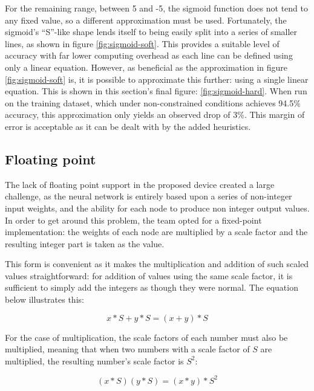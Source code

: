 For the remaining range, between 5 and -5, the sigmoid function does not tend to any fixed value, so a different approximation must be used. Fortunately, the sigmoid's ``S''-like shape lends itself to being easily split into a series of smaller lines, as shown in figure \ref{fig:sigmoid-soft}. This provides a suitable level of accuracy with far lower computing overhead as each line can be defined using only a linear equation. However, as beneficial as the approximation in figure \ref{fig:sigmoid-soft} is, it is possible to approximate this further: using a single linear equation. This is shown in this section's final figure: \ref{fig:sigmoid-hard}. When run on the training dataset, which under non-constrained conditions achieves 94.5\% accuracy, this approximation only yields an observed drop of 3\%. This margin of error is acceptable as it can be dealt with by the added heuristics.

\subsection{Floating point \label{sec:floating-point}}
The lack of  floating point support in the proposed device created a large challenge, as the neural network is entirely based upon a series of non-integer input weights, and the ability for each node to produce non integer output values. In order to get around this problem, the team opted for a fixed-point implementation: the weights of each node are multiplied by a scale factor and the resulting integer part is taken as the value.

This form is convenient as it makes the multiplication and addition of such scaled values straightforward: for addition of values using the same scale factor, it is sufficient to simply add the integers as though they were normal. The equation below illustrates this:

\begin{equation}
\label{eq:bits:addition}
x*S+y*S=(x+y)*S
\end{equation}

For the case of multiplication, the scale factors of each number must also be multiplied, meaning that when two numbers with a scale factor of $S$ are multiplied, the resulting number's scale factor is $S^2$:

\begin{equation}
\label{eq:bits:multiplication}
(x*S)(y*S)=(x*y)*S^2
\end{equation}


